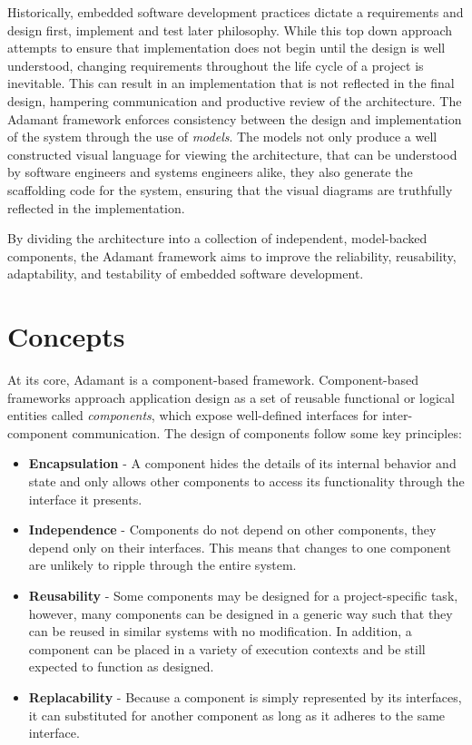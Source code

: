 Historically, embedded software development practices dictate a requirements and design first, implement and test later philosophy. While this top down approach attempts to ensure that implementation does not begin until the design is well understood, changing requirements throughout the life cycle of a project is inevitable. This can result in an implementation that is not reflected in the final design, hampering communication and productive review of the architecture. The Adamant framework enforces consistency between the design and implementation of the system through the use of \textit{models}. The models not only produce a well constructed visual language for viewing the architecture, that can be understood by software engineers and systems engineers alike, they also generate the scaffolding code for the system, ensuring that the visual diagrams are truthfully reflected in the implementation.  

By dividing the architecture into a collection of independent, model-backed components, the Adamant framework aims to improve the reliability, reusability, adaptability, and testability of embedded software development.

\section{Concepts}

At its core, Adamant is a component-based framework. Component-based frameworks approach application design as a set of reusable functional or logical entities called \textit{components}, which expose well-defined interfaces for inter-component communication. The design of components follow some key principles:

\begin{itemize}
  \item \textbf{Encapsulation} - A component hides the details of its internal behavior and state and only allows other components to access its functionality through the interface it presents. 
  \item \textbf{Independence} - Components do not depend on other components, they depend only on their interfaces. This means that changes to one component are unlikely to ripple through the entire system. 
  \item \textbf{Reusability} - Some components may be designed for a project-specific task, however, many components can be designed in a generic way such that they can be reused in similar systems with no modification. In addition, a component can be placed in a variety of execution contexts and be still expected to function as designed.
  \item \textbf{Replacability} - Because a component is simply represented by its interfaces, it can substituted for another component as long as it adheres to the same interface. 
\end{itemize}


